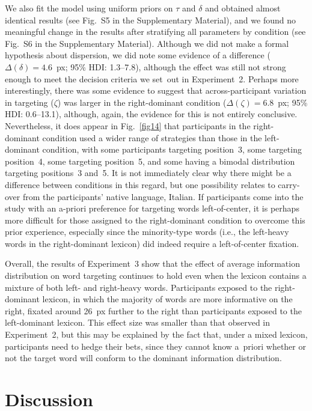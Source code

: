 \documentclass[doc,biblatex]{apa7}
\begin{document}
We also fit the model using uniform priors on $\tau$ and $\delta$ and obtained almost identical results (see Fig.~S5 in the Supplementary Material), and we found no meaningful change in the results after stratifying all parameters by condition (see Fig.~S6 in the Supplementary Material). Although we did not make a formal hypothesis about dispersion, we did note some evidence of a difference ($\Delta(\delta) = 4.6$~px; 95\% HDI: 1.3--7.8), although the effect was still not strong enough to meet the decision criteria we set~out in Experiment~2. Perhaps more interestingly, there was some evidence to suggest that across-participant variation in targeting ($\zeta$) was larger in the right-dominant condition ($\Delta(\zeta) = 6.8$~px; 95\% HDI: 0.6--13.1), although, again, the evidence for this is not entirely conclusive. Nevertheless, it does appear in Fig.~\ref{fig14} that participants in the right-dominant condition used a wider range of strategies than those in the left-dominant condition, with some participants targeting position~3, some targeting position~4, some targeting position~5, and some having a bimodal distribution targeting positions~3 and~5. It is not immediately clear why there might be a difference between conditions in this regard, but one possibility relates to carry-over from the participants' native language, Italian. If participants come into the study with an a-priori preference for targeting words left-of-center, it is perhaps more difficult for those assigned to the right-dominant condition to overcome this prior experience, especially since the minority-type words (i.e., the left-heavy words in the right-dominant lexicon) did indeed require a left-of-center fixation.

Overall, the results of Experiment~3 show that the effect of average information distribution on word targeting continues to hold even when the lexicon contains a mixture of both left- and right-heavy words. Participants exposed to the right-dominant lexicon, in which the majority of words are more informative on the right, fixated around 26~px further to the right than participants exposed to the left-dominant lexicon. This effect size was smaller than that observed in Experiment~2, but this may be explained by the fact that, under a mixed lexicon, participants need to hedge their bets, since they cannot know a~priori whether or not the target word will conform to the dominant information distribution.

\section{Discussion}
\end{document}
